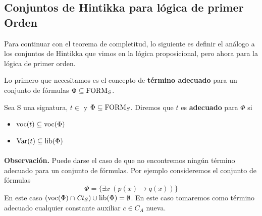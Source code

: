 \subsection{Conjuntos de Hintikka para lógica de primer Orden}
Para continuar con el teorema de completitud, lo siguiente es definir el análogo a los conjuntos de Hintikka que vimos en la lógica proposicional, pero ahora para la lógica de primer orden.

Lo primero que necesitamos es el concepto de \textbf{término adecuado} para un conjunto de fórmulas $\Phi\subseteq \mbox{FORM}_{S}$.

\begin{definition}
  Sea S una signatura, $t\in $ y $\Phi\subseteq\mbox{FORM}_{S}$. Diremos que $t$ es \textbf{adecuado} para $\Phi$ si
  \begin{itemize}
  \item $\mbox{voc}(t)\subseteq \mbox{voc}(\Phi)$ 
  \item $\mbox{Var}(t)\subseteq \mbox{lib}(\Phi)$
  \end{itemize}
\end{definition}
\paragraph{}
\textbf{Observación.} Puede darse el caso de que no encontremos ningún término adecuado para un conjunto de fórmulas. Por ejemplo consideremos el conjunto de fórmulas
\[ \Phi = \{\exists x\ (p(x)\rightarrow q(x))\} \]
En este caso $(\mbox{voc}(\Phi)\cap\mathit{Ct}_{S}) \cup \mbox{lib}(\Phi)=\emptyset$. En este caso
tomaremos como término adecuado cualquier constante auxiliar $c \in C_A$ nueva.

